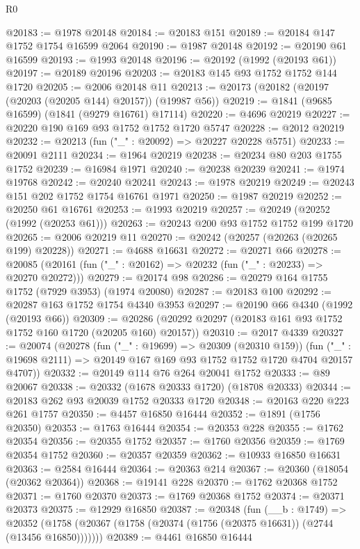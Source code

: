 \begin{lexlean}{R0}
\begin{coremodule}
@20183 := @1978 @20148
@20184 := @20183 @151
@20189 := @20184 @147 @1752 @1754 @16599 @2064
@20190 := @1987 @20148
@20192 := @20190 @61 @16599
@20193 := @1993 @20148
@20196 := @20192 (@1992 (@20193 @61))
@20197 := @20189 @20196
@20203 := @20183 @145 @93 @1752 @1752 @144 @1720
@20205 := @2006 @20148 @11
@20213 := @20173 (@20182 (@20197 (@20203 (@20205 @144) @20157)) (@19987 @56))
@20219 := @1841 (@9685 @16599) (@1841 (@9279 @16761) @17114)
@20220 := @4696 @20219
@20227 := @20220 @190 @169 @93 @1752 @1752 @1720 @5747
@20228 := @2012 @20219
@20232 := @20213 (fun ("_" : @20092) => @20227 @20228 @5751)
@20233 := @20091 @2111
@20234 := @1964 @20219
@20238 := @20234 @80 @203 @1755 @1752
@20239 := @16984 @1971
@20240 := @20238 @20239
@20241 := @1974 @19768
@20242 := @20240 @20241
@20243 := @1978 @20219
@20249 := @20243 @151 @202 @1752 @1754 @16761 @1971
@20250 := @1987 @20219
@20252 := @20250 @61 @16761
@20253 := @1993 @20219
@20257 := @20249 (@20252 (@1992 (@20253 @61)))
@20263 := @20243 @200 @93 @1752 @1752 @199 @1720
@20265 := @2006 @20219 @11
@20270 := @20242 (@20257 (@20263 (@20265 @199) @20228))
@20271 := @4688 @16631
@20272 := @20271 @66
@20278 := @20085 (@20161 (fun ("_" : @20162) => @20232 (fun ("_" : @20233) => @20270 @20272)))
@20279 := @20174 @98
@20286 := @20279 @164 @1755 @1752 (@7929 @3953) (@1974 @20080)
@20287 := @20183 @100
@20292 := @20287 @163 @1752 @1754 @4340 @3953
@20297 := @20190 @66 @4340 (@1992 (@20193 @66))
@20309 := @20286 (@20292 @20297 (@20183 @161 @93 @1752 @1752 @160 @1720 (@20205 @160) @20157))
@20310 := @2017 @4339
@20327 := @20074
    (@20278
      (fun ("_" : @19699) => @20309 (@20310 @159))
      (fun ("_" : @19698 @2111) => @20149 @167 @169 @93 @1752 @1752 @1720 @4704 @20157 @4707))
@20332 := @20149 @114 @76 @264 @20041 @1752
@20333 := @89 @20067
@20338 := @20332 (@1678 @20333 @1720) (@18708 @20333)
@20344 := @20183 @262 @93 @20039 @1752 @20333 @1720
@20348 := @20163 @220 @223 @261 @1757
@20350 := @4457 @16850 @16444
@20352 := @1891 (@1756 @20350)
@20353 := @1763 @16444
@20354 := @20353 @228
@20355 := @1762 @20354
@20356 := @20355 @1752
@20357 := @1760 @20356
@20359 := @1769 @20354 @1752
@20360 := @20357 @20359
@20362 := @10933 @16850 @16631
@20363 := @2584 @16444
@20364 := @20363 @214
@20367 := @20360 (@18054 (@20362 @20364))
@20368 := @19141 @228
@20370 := @1762 @20368 @1752
@20371 := @1760 @20370
@20373 := @1769 @20368 @1752
@20374 := @20371 @20373
@20375 := @12929 @16850
@20387 := @20348
    (fun (__b : @1749) =>
    @20352 (@1758 (@20367 (@1758 (@20374 (@1756 (@20375 @16631)) (@2744 (@13456 @16850)))))))
@20389 := @4461 @16850 @16444

\end{coremodule}
\end{lexlean}
